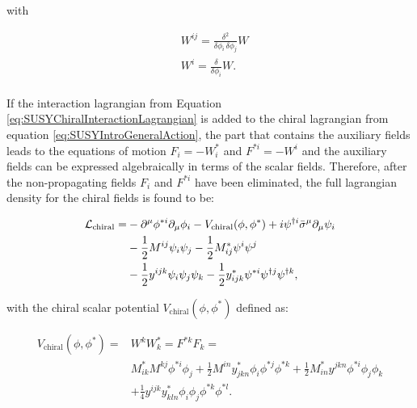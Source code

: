 \noindent with

\begin{equation}
\begin{split}
& W^{ij} = \frac{\delta^2}{\delta\phi_i \, \delta\phi_j} W \\
& W^{i} = \frac{\delta}{\delta\phi_i} W. \\
\end{split}
\label{eq:SUSYChiralSuperpotentialDerivations}
\end{equation}

If the interaction lagrangian from Equation \ref{eq:SUSYChiralInteractionLagrangian} is added to the chiral lagrangian from equation \ref{eq:SUSYIntroGeneralAction}, the part that contains the auxiliary fields leads to the equations of motion $F_i = - W^{\ast}_i$ and $F^{\ast i} = - W^i$ and the auxiliary fields can be expressed algebraically in terms of the scalar fields.
Therefore, after the non-propagating fields $F_i$ and $F^{\ast i}$ have been eliminated, the full lagrangian density for the chiral fields is found to be:

\begin{equation}
\begin{split}
\lagrangian_{\text{chiral}} = & -\partial^\mu \phi^{\ast i} \partial_\mu \phi_i - V_\text{chiral}(\phi, \phi^{\ast}) + i\psi^{\dagger i}\bar{\sigma}^\mu \partial_\mu \psi_i \\
& - \frac{1}{2}M^{ij}\psi_i\psi_j - \frac{1}{2}M^{\ast}_{ij} \psi^i \psi^j \\
& - \frac{1}{2}y^{ijk}\psi_i \psi_j \psi_k - \frac{1}{2}y^{\ast}_{ijk}\psi^{\ast i} \psi^{\dagger j} \psi^{\dagger k},
\end{split}
\label{eq:SUSYChiralFinalLagrangian}
\end{equation}

\noindent with the chiral scalar potential $V_\text{chiral}(\phi, \phi^{\ast})$ defined as:

\begin{equation}
\begin{split}
V_\text{chiral}(\phi, \phi^{\ast}) = & W^k W^\ast_k = F^{\ast k} F_k = \\
& M^{\ast}_{ik} M^{kj} \phi^{\ast i} \phi_j + \frac{1}{2}M^{in} y^{\ast}_{jkn} \phi_i \phi^{\ast j} \phi^{\ast k} + \frac{1}{2}M^\ast_{in} y^{jkn} \phi^{\ast i} \phi_{j} \phi_{k} \\
& + \frac{1}{4} y^{ijk} y^{\ast}_{kln}\phi_i \phi_j \phi^{\ast k} \phi^{\ast l}.
\end{split}
\label{eq:SUSYChiralScalarPotential}
\end{equation}



